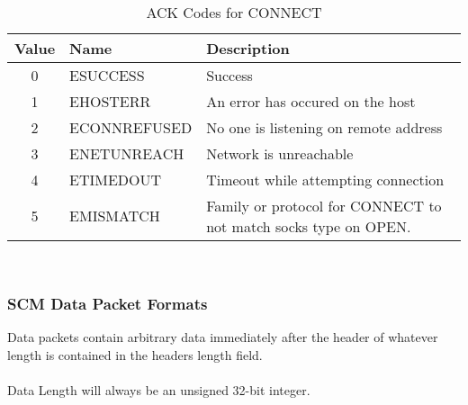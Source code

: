 \documentclass[10pt]{article}
\begin{document}
	\\
	\begin{table}[H]
		\begin{center}
			\caption{ACK Codes for CONNECT}
			\label{tab:connErrTable}
			\begin{tabular}{c|l|l} 
				\rowcolor{lightgray}
				\textbf{Value} &	\textbf{Name} & \textbf{Description}\\
				\hline
				0 & ESUCCESS & Success\\
				1 & EHOSTERR & An error has occured on the host\\
				2 & ECONNREFUSED & No one is listening on remote address\\
				3 & ENETUNREACH & Network is unreachable\\
				4 & ETIMEDOUT & Timeout while attempting connection\\
				5 & EMISMATCH & Family or protocol for CONNECT to not match socks type on OPEN.\\
			\end{tabular}
		\end{center}
	\end{table} \mbox{}\\
	\subsubsection{SCM Data Packet Formats} \mbox{}
	Data packets contain arbitrary data immediately after the header of whatever length is contained in the headers length field. \\
	\\
	Data Length will always be an unsigned 32-bit integer. 
\end{document}
